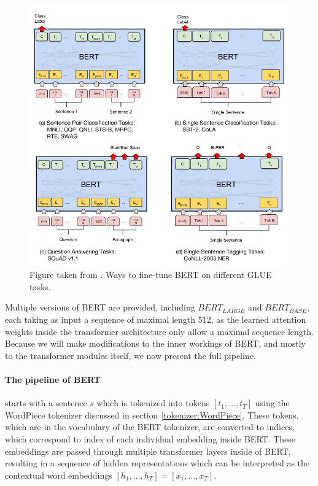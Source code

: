 \documentclass[a4paper,12pt,oneside,openright]{report}
\begin{document}
\begin{figure}[h]
	\center
  \includegraphics[width=0.7\linewidth]{./assets/background/BERT_GLUE_finetune.png}
  \caption{Figure taken from \cite{devlin18}. Ways to fine-tune BERT on different GLUE tasks.}
  \label{fig:cbow_skipgram}
\end{figure}

Multiple versions of BERT are provided, including $BERT_{LARGE}$ and $BERT_{BASE}$, each taking as input a sequence of maximal length 512, as the learned attention weights inside the transformer architecture only allow a maximal sequence length. 
Because we will make modifications to the inner workings of BERT, and mostly to the transformer modules itself, we now present the full pipeline. 

\paragraph{The pipeline of BERT} starts with a sentence $s$ which is tokenized into tokens $[t_1, \ldots, t_T]$ using the WordPiece tokenizer discussed in section \ref{tokenizer:WordPiece}.
These tokens, which are in the vocabulary of the BERT tokenizer, are converted to indices, which correspond to index of each individual embedding inside BERT.
These embeddings are passed through multiple transformer layers inside of BERT, resulting in a sequence of hidden representations which can be interpreted as the contextual word embeddings $[h_1, \ldots, h_T] = [x_1, \ldots, x_T]$.
\end{document}
